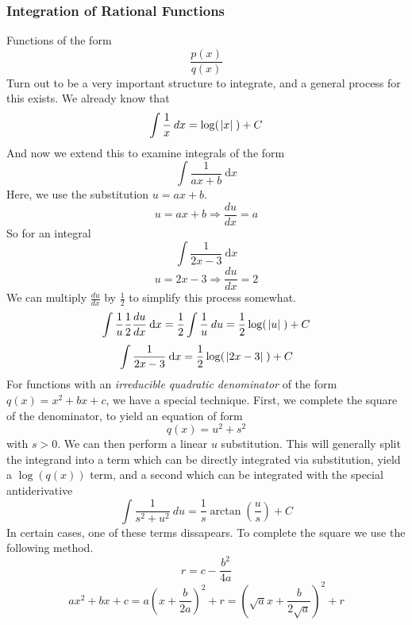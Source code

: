 \documentclass[12pt]{report}
\newcommand{\dx}{\:\mathrm{d}x}
\begin{document}
\begin{flushleft}
\subsubsection*{Integration of Rational Functions}
Functions of the form
\[\frac{p(x)}{q(x)}\]
Turn out to be a very important structure to integrate, and a general process 
for this exists. We already know that
\[\int \frac{1}{x} \: dx = \log(\;\abs{x}\;) + C\]
And now we extend this to examine integrals of the form
\[\int \frac{1}{ax + b} \dx\]
Here, we use the substitution \(u = ax + b\).
\[u = ax + b \Rightarrow \frac{du}{dx} = a\]
So for an integral
\[\int \frac{1}{2x - 3} \dx\]
\[u = 2x - 3 \Rightarrow \frac{du}{dx} = 2\]
We can multiply \(\frac{du}{dx}\) by \(\frac{1}{2}\) to simplify this process
somewhat.
\[\int \frac{1}{u} \frac{1}{2}\frac{du}{dx} \dx 
= \frac{1}{2} \int\frac{1}{u}\:du = \frac{1}{2}\log(\;\abs{u}\;) + C\]
\[\int \frac{1}{2x - 3} \dx = \frac{1}{2}\log(\;\abs{2x - 3}\;) + C\]
For functions with an \textit{irreducible quadratic denominator} of the form
\(q(x) = x^2 + bx + c\), we have a special technique. First, we complete the
square of the denominator, to yield an equation of form
\[q(x) = u^2 + s^2\]
with \(s > 0\). We can then perform a linear \(u\) substitution. This will
generally split the integrand into a term which can be directly integrated via
substitution, yield a \(\log(q(x))\) term, and a second which can be integrated
with the special antiderivative
\[\int \frac{1}{s^2 + u^2} \:du = \frac{1}{s}\arctan(\frac{u}{s}) + C\]
In certain cases, one of these terms dissapears. To complete the square we
use the following method.
\[r = c - \frac{b^2}{4a}\]
\[ax^2 + bx + c = a\left(x + \frac{b}{2a}\right)^2 + r 
= \left(\sqrt{a}x + \frac{b}{2\sqrt{a}}\right)^2 + r\]


\end{flushleft}
\end{document}
